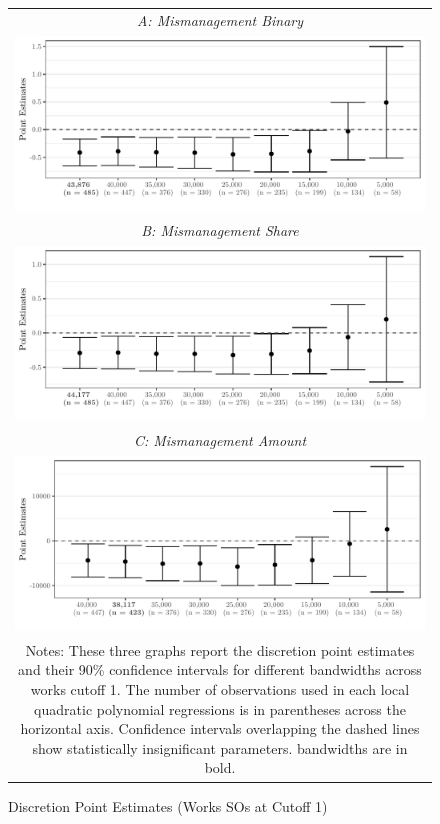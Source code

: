 \documentclass[11pt]{article}
\begin{document}
\begin{figure}[ht]
\caption{Discretion Point Estimates (Works SOs at Cutoff 1)}\label{fig:bandwidths}
\centering
\small
\begin{tabular}{c}
\emph{A: Mismanagement Binary} \\
\includegraphics[scale = .70]{../plots/mismanagementplot1.pdf} \\
\emph{B: Mismanagement Share} \\
\includegraphics[scale = .70]{../plots/mismanagementplot2.pdf} \\
\emph{C: Mismanagement Amount} \\
\includegraphics[scale = .70]{../plots/mismanagementplot3.pdf} \\
\multicolumn{1}{p{.80\textwidth}}{\scriptsize Notes: These three graphs report the discretion point estimates and their 90\% confidence intervals for different bandwidths across works cutoff 1. The number of observations used in each local quadratic polynomial regressions is in parentheses across the horizontal axis. Confidence intervals overlapping the dashed lines show statistically insignificant parameters. \citet{CalonicoOptimalDataDrivenRegression2015} bandwidths are in bold.}
\end{tabular}
\end{figure}
\end{document}
